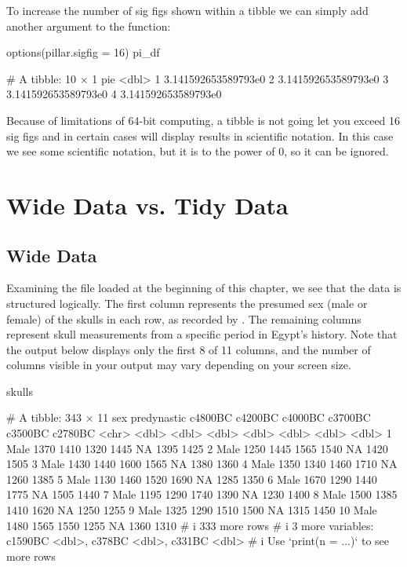 To increase the number of sig figs shown within a tibble we can simply add another argument to the  function:

\begin{inR}
options(pillar.sigfig = 16)
pi_df
\end{inR}
\begin{outR}
# A tibble: 10 × 1
                   pie
                 <dbl>
 1 3.141592653589793e0
 2 3.141592653589793e0
 3 3.141592653589793e0
 4 3.141592653589793e0
\end{outR}

\noindent
Because of limitations of 64-bit computing, a tibble is not going let you exceed 16 sig figs and in certain cases will display results in scientific notation. In this case we see some scientific notation, but it is to the power of 0, so it can be ignored.

\clearpage

\section{Wide Data vs. Tidy Data}

\subsection{Wide Data}
\label{sec:wide_data}

Examining the  file loaded at the beginning of this chapter, we see that the data is structured logically. The first column represents the presumed sex (male or female) of the skulls in each row, as recorded by \textcite{Thomson1905}. The remaining columns represent skull measurements from a specific period in Egypt's history. Note that the output below displays only the first 8 of 11 columns, and the number of columns visible in your output may vary depending on your screen size.

\begin{inR}
skulls
\end{inR}

\begin{outR}
# A tibble: 343 × 11
   sex   predynastic c4800BC c4200BC c4000BC c3700BC c3500BC c2780BC
   <chr>       <dbl>   <dbl>   <dbl>   <dbl>   <dbl>   <dbl>   <dbl>
 1 Male         1370    1410    1320    1445      NA    1395    1425
 2 Male         1250    1445    1565    1540      NA    1420    1505
 3 Male         1430    1440    1600    1565      NA    1380    1360
 4 Male         1350    1340    1460    1710      NA    1260    1385
 5 Male         1130    1460    1520    1690      NA    1285    1350
 6 Male         1670    1290    1440    1775      NA    1505    1440
 7 Male         1195    1290    1740    1390      NA    1230    1400
 8 Male         1500    1385    1410    1620      NA    1250    1255
 9 Male         1325    1290    1510    1500      NA    1315    1450
10 Male         1480    1565    1550    1255      NA    1360    1310
# i 333 more rows
# i 3 more variables: c1590BC <dbl>, c378BC <dbl>, c331BC <dbl>
# i Use `print(n = ...)` to see more rows
\end{outR}

